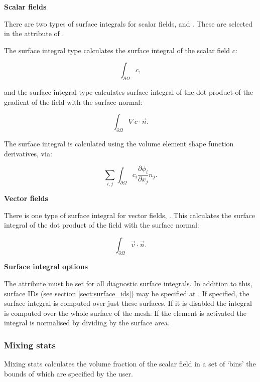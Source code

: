\textbf{Scalar fields}

There are two types of surface integrals for scalar fields,  and
. These are selected in the  attribute of
.

The surface integral type  calculates the surface integral of the
scalar field $c$:

\begin{equation}
\int_{\partial \Omega} c,
\end{equation}

and the surface integral type  calculates surface integral
of the dot product of the gradient of the field with the surface normal:

\begin{equation}
\int_{\partial \Omega} \nabla c \cdot \vec{n}.
\end{equation}

The  surface integral is calculated using the volume
element shape function derivatives, via:

\begin{equation}
\sum_{i,j} \int_{\partial \Omega} {c_i \frac{\partial \phi_i}{\partial x_j} n_j}.
\end{equation}

\textbf{Vector fields}

There is one type of surface integral for vector fields, . This
calculates the surface integral of the dot product of the field with the surface
normal:

\begin{equation}
\int_{\partial \Omega} \vec{v} \cdot \vec{n}.
\end{equation}

\textbf{Surface integral options}

The  attribute must be set for all diagnostic surface integrals. In
addition to this, surface IDs (see section \ref{sect:surface_ids}) may be specified at
. If specified, the surface
integral is computed over just these surfaces. If it is disabled the integral is computed
over the whole surface of the
mesh. If the element  is activated
the integral is normalised by dividing by the surface area.

\subsubsection{Mixing stats}
\label{sect:stat_mixing_stats}
Mixing stats calculates the volume fraction of the scalar field in a set of `bins' the bounds of which are specified by the user. 

